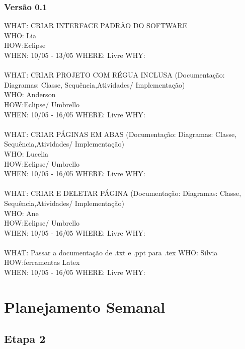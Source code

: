 \documentclass[12pt,a4paper]{article}
\begin{document}
\subsubsection*{Versão 0.1}

WHAT: CRIAR INTERFACE PADRÃO DO SOFTWARE\\
WHO: Lia\\
HOW:Eclipse\\ 
WHEN: 10/05 - 13/05  WHERE: Livre  WHY:\\
\\
WHAT: CRIAR PROJETO COM RÉGUA INCLUSA (Documentação: Diagramas: Classe, Sequência,Atividades/ Implementação)\\
WHO: Anderson\\
HOW:Eclipse/ Umbrello\\
WHEN: 10/05 - 16/05  WHERE: Livre  WHY:\\ 
\\
WHAT: CRIAR PÁGINAS EM ABAS (Documentação: Diagramas: Classe, Sequência,Atividades/ Implementação)\\
WHO: Lucelia\\
HOW:Eclipse/ Umbrello\\ 
WHEN: 10/05 - 16/05  WHERE: Livre  WHY:\\ 
\\
WHAT: CRIAR E DELETAR PÁGINA (Documentação: Diagramas: Classe, Sequência,Atividades/ Implementação)\\
WHO: Ane\\
HOW:Eclipse/ Umbrello\\ 
WHEN: 10/05 - 16/05  WHERE: Livre  WHY:\\ 
\\
WHAT: Passar a documentação de .txt e .ppt para .tex
WHO: Silvia\\
HOW:ferramentas Latex\\
WHEN: 10/05 - 16/05  WHERE: Livre  WHY:\\
\newpage
\section*{Planejamento Semanal}
\subsection*{Etapa 2}
\end{document}

